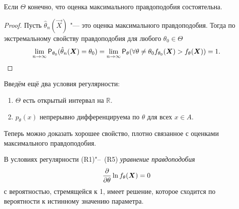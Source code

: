 \begin{consequence}
    Если $\Theta$ конечно, что оценка максимального правдоподобия состоятельна.
\end{consequence}
\begin{proof}
    Пусть $\hat{\theta}_{n}(\vec{X})$ "--- это оценка максимального правдоподобия. Тогда по экстремальному свойству правдоподобия для любого $\theta_{0} \in \Theta$
    \[
        \lim\limits_{n \to \infty} \Pr_{\theta_{0}}(\hat{\theta}_{n}(\vec{X}) = \theta_{0}) 
        = \lim\limits_{n \to \infty} \Pr_{\theta}(\forall \theta \neq \theta_{0} f_{\theta_{0}}(\vec{X}) > f_{\theta}(\vec{X}))
        = 1. \qedhere
    \]
\end{proof}

Введём ещё два условия регулярности:
\begin{enumerate}[label=(R\arabic*), start=4]
    \item $\Theta$ есть открытый интервал на $\mathbb{R}$.
    \item $p_{\theta}(x)$ непрерывно дифференцируема по $\theta$ для всех $x \in A$.
\end{enumerate}
Теперь можно доказать хорошее свойство, плотно связанное с оценками максимального правдоподобия.
\begin{theorem}
    В условиях регулярности (R1)"--~(R5) \emph{уравнение правдоподобия}
    \[
        \pdv{\theta}\ln f_{\theta}(\vec{X}) = 0
    \]
    с вероятностью, стремящейся к 1, имеет решение, которое сходится по вероятности к истинному значению параметра.
\end{theorem}
